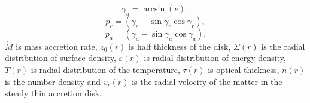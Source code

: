 \documentclass[useAMS,usenatbib]{mn2e}
\begin{document}
\begin{equation}
\gamma_a = \arcsin(e),
\end{equation}
\begin{equation}
p_r = (\gamma_r - \sin\gamma_r\cos\gamma_r),
\end{equation}
\begin{equation}
p_a = (\gamma_a - \sin\gamma_a\cos\gamma_a).
\end{equation}
$\dot{M}$ is mass accretion rate, $z_0(r)$ is half thickness of the disk, $\Sigma(r)$ is the radial distribution of surface density, $\varepsilon(r)$ is radial distribution of energy density, $T(r)$ is radial distribution of the temperature, $\tau(r)$ is optical thickness, $n(r)$ is the number density and $v_r(r)$ is the radial velocity of the matter in the steady thin accretion disk.
\end{document}
